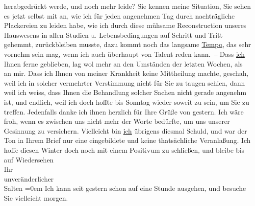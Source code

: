 \begin{ledgroupsized}[t]{13cm}
               herabgedrückt werde, und noch mehr leide? Sie kennen meine Situation, Sie sehen es
               jetzt selbst mit an, wie ich für jeden ange{\pb}nehmen Tag durch
               nachträgliche Plackereien zu leiden habe, wie ich durch diese mühsame Reconstruction
               unseres Hauswesens in allen Studien u. Lebensbedingungen auf Schritt und Tritt
               gehemmt, zurückbleiben musste, dazu kommt noch das langsame \uline{Tempo}, das sehr vornehm sein mag, wenn ich \introOben{}auch\introOben{} überhaupt von Talent reden kann. –\pend
           \pstart
           Dass \uline{ich} Ihnen ferne geblieben, lag wol mehr an den
               Umständen der letzten Wochen, als an mir. Dass ich Ihnen von meiner Krankheit keine
               Mittheilung machte, geschah, weil ich in solcher vermehrter {\pb}Verstimmung nicht für Sie zu
               taugen schien, dann weil ich weiss, dass Ihnen die Behandlung solcher Sachen nicht
               gerade angenehm ist, und endlich, weil ich doch hoffte bis Sonntag
               wieder soweit zu sein, um Sie zu treffen. \pend
           \pstart
           Jedenfalls danke ich ihnen herzlich für Ihre Grüße von gestern. Ich wäre froh, wenn
               es zwischen uns nicht mehr der Worte bedürfte, um uns unserer Gesinnung zu
               versichern. Vielleicht bin \uline{ich} übrigens diesmal
               Schuld, und war der Ton in Ihrem Brief nur eine eingebildete und keine thatsächliche
               Veranlaßung. \pend
           \pstart
           Ich hoffe diesen Winter doch noch mit einem Positivum zu schließen, und bleibe
               bis auf Wiedersehen {\\[\baselineskip]}Ihr {\\[\baselineskip]}unveränderlicher {\\[\baselineskip]}\spacefill\mbox{Salten}\pend
           \leftskip=0em{}\pstart
           \noindent{}Ich kann seit gestern schon auf eine Stunde ausgehen, und besuche Sie vielleicht
                  morgen. \pend
           
         
         \endnumbering{}\end{ledgroupsized}\begin{anhang}\end{anhang}\newcommand{\dateiname}{L03132}\newcommand{\titel}{Felix Salten an Arthur Schnitzler, [24. 1. 1894]}\newcommand{\editorInnen}{Martin Anton Müller und Laura Untner}
      